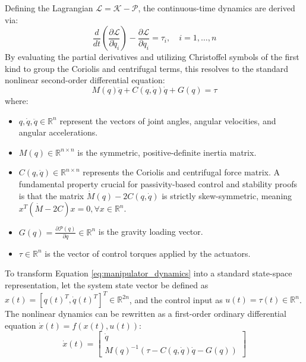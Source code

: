 Defining the Lagrangian $\mathcal{L} = \mathcal{K} - \mathcal{P}$, the continuous-time dynamics are derived via:
\begin{equation}
    \frac{d}{dt} \left( \frac{\partial \mathcal{L}}{\partial \dot{q}_i} \right) - \frac{\partial \mathcal{L}}{\partial q_i} = \tau_i, \quad i = 1, \dots, n
\end{equation}
By evaluating the partial derivatives and utilizing Christoffel symbols of the first kind to group the Coriolis and centrifugal terms, this resolves to the standard nonlinear second-order differential equation:
\begin{equation} \label{eq:manipulator_dynamics}
    M(q)\ddot{q} + C(q,\dot{q})\dot{q} + G(q) = \tau
\end{equation}
where:
\begin{itemize}
    \item $q, \dot{q}, \ddot{q} \in \mathbb{R}^n$ represent the vectors of joint angles, angular velocities, and angular accelerations.
    \item $M(q) \in \mathbb{R}^{n \times n}$ is the symmetric, positive-definite inertia matrix.
    \item $C(q, \dot{q}) \in \mathbb{R}^{n \times n}$ represents the Coriolis and centrifugal force matrix. A fundamental property crucial for passivity-based control and stability proofs is that the matrix $\dot{M}(q) - 2C(q, \dot{q})$ is strictly skew-symmetric, meaning $x^T (\dot{M} - 2C) x = 0, \forall x \in \mathbb{R}^n$.
    \item $G(q) = \frac{\partial \mathcal{P}(q)}{\partial q} \in \mathbb{R}^n$ is the gravity loading vector.
    \item $\tau \in \mathbb{R}^n$ is the vector of control torques applied by the actuators.
\end{itemize}

To transform Equation \ref{eq:manipulator_dynamics} into a standard state-space representation, let the system state vector be defined as $x(t) = [q(t)^T, \dot{q}(t)^T]^T \in \mathbb{R}^{2n}$, and the control input as $u(t) = \tau(t) \in \mathbb{R}^n$. The nonlinear dynamics can be rewritten as a first-order ordinary differential equation $\dot{x}(t) = f(x(t), u(t))$:
\begin{equation}
    \dot{x}(t) = \begin{bmatrix} \dot{q} \\ M(q)^{-1}(\tau - C(q,\dot{q})\dot{q} - G(q)) \end{bmatrix}
\end{equation}

